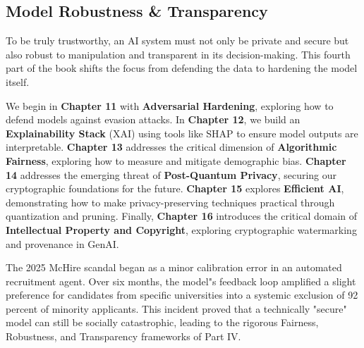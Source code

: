 % 
%

\begin{partbacktext}
\part{Model Robustness \& Transparency}
\noindent To be truly trustworthy, an AI system must not only be private and secure but also robust to manipulation and transparent in its decision-making. This fourth part of the book shifts the focus from defending the data to hardening the model itself.

We begin in \textbf{Chapter 11} with \textbf{Adversarial Hardening}, exploring how to defend models against evasion attacks. In \textbf{Chapter 12}, we build an \textbf{Explainability Stack} (XAI) using tools like SHAP to ensure model outputs are interpretable. \textbf{Chapter 13} addresses the critical dimension of \textbf{Algorithmic Fairness}, exploring how to measure and mitigate demographic bias. \textbf{Chapter 14} addresses the emerging threat of \textbf{Post-Quantum Privacy}, securing our cryptographic foundations for the future. \textbf{Chapter 15} explores \textbf{Efficient AI}, demonstrating how to make privacy-preserving techniques practical through quantization and pruning. Finally, \textbf{Chapter 16} introduces the critical domain of \textbf{Intellectual Property and Copyright}, exploring cryptographic watermarking and provenance in GenAI.

\begin{casestudy} 
The 2025 McHire scandal began as a minor calibration error in an automated recruitment agent. Over six months, the model"s feedback loop amplified a slight preference for candidates from specific universities into a systemic exclusion of 92 percent of minority applicants. This incident proved that a technically "secure" model can still be socially catastrophic, leading to the rigorous Fairness, Robustness, and Transparency frameworks of Part IV. 
\end{casestudy} 
\end{partbacktext}
